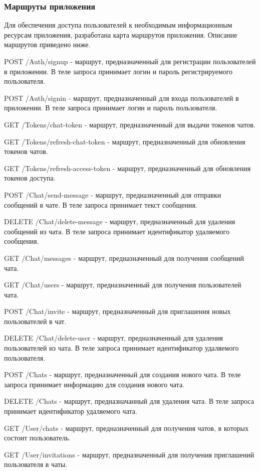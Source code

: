 \subsubsection{Маршруты приложения}

Для обеспечения доступа пользователей к необходимым информационным ресурсам приложения, разработана карта маршрутов приложения. Описание маршрутов приведено ниже.

POST /Auth/signup - маршрут, предназначенный для регистрации пользователей в приложении. В теле запроса принимает логин и пароль регистрируемого пользователя.

POST /Auth/signin - маршрут, предназначенный для входа пользователей в приложении. В теле запроса принимает логин и пароль пользователя.

GET /Tokens/chat-token - маршрут, предназначенный для выдачи токенов чатов.

GET /Tokens/refresh-chat-token - маршрут, предназначенный для обновления токенов чатов.

GET /Tokens/refresh-access-token - маршрут, предназначенный для обновления токенов доступа.

POST /Chat/send-message - маршрут, предназначенный для отправки сообщений в чате. В теле запроса принимает текст сообщения.

DELETE /Chat/delete-message - маршрут, предназначенный для удаления сообщений из чата. В теле запроса принимает идентификатор удаляемого сообщения.

GET /Chat/messages - маршрут, предназначенный для получения сообщений чата.

GET /Chat/users - маршрут, предназначенный для получения пользователей чата.

POST /Chat/invite - маршрут, предназначенный для приглашения новых пользователей в чат.

DELETE /Chat/delete-user - маршрут, предназначенный для удаления пользователей из чата. В теле запроса принимает идентификатор удаляемого пользователя.

POST /Chats - маршрут, предназначенный для создания нового чата. В теле запроса принимает информацию для создания нового чата.

DELETE /Chats - маршрут, предназначанный для удаления чата. В теле запроса принимает идентификатор удаляемого чата.

GET /User/chats - маршрут, предназначенный для получения чатов, в которых состоит пользователь.

GET /User/invitations - маршрут, предназначенный для получения приглашений пользователя в чаты.

